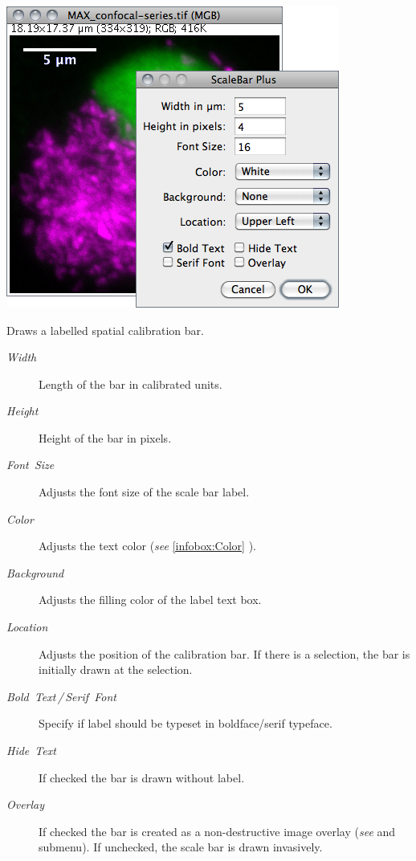 \subsubsection[\protect\userinterface{Scale Bar\ldots{}}]{\protect{}\label{sub:Scale-Bar...}\improvement{}}

\begin{minipage}[c][1\totalheight][t]{0.56\columnwidth}%
\includegraphics[scale=0.55]{images/ScaleBar}%
\end{minipage}%
\begin{minipage}[c][1\totalheight][t]{0.44\columnwidth}%
Draws a labelled spatial calibration bar.
\begin{description}
\item [{\emph{Width}}] Length of the bar in calibrated units.
\item [{\emph{Height}}] Height of the bar in pixels.
\item [{\emph{Font\ Size}}] Adjusts the font size of the scale bar label.
\item [{\emph{Color}}] Adjusts the text color (\emph{see} \ref{infobox:Color}
).
\item [{\emph{Background}}] Adjusts the filling color of the label text
box.\end{description}
%
\end{minipage}
\begin{description}
\item [{\emph{Location}}] Adjusts the position of the calibration bar.
If there is a selection, the bar is initially drawn at the selection.
\item [{\emph{Bold\ Text\,/\,Serif\ Font}}] Specify if label should
be typeset in boldface/serif typeface.
\item [{\emph{Hide}\ \emph{Text}}] If checked the bar is drawn without
label.
\item [{\emph{Overlay}}] If checked the bar is created as a non-destructive
image overlay (\emph{see}  and 
submenu). If unchecked, the scale bar is drawn invasively.
\end{description}

